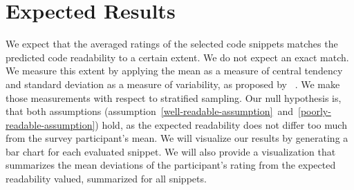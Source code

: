 \documentclass[%
class=scrreprt,
chapterprefix=false,%
open=right,%
twoside=false,%
paper=a4,%
logofile={Logo\_zentral\_farbig\_EN.png},%
thesistype=masterproposal,%
UKenglish,%
]{se2thesis}
\begin{document}
\section{Expected Results}
We expect that the averaged ratings of the selected code snippets matches the predicted code readability to a certain extent. We do not expect an exact match.
We measure this extent by applying the mean as a measure of central tendency and standard deviation as a measure of variability, as proposed by \citeauthor{linaker2015guidelines}~\cite{linaker2015guidelines}. We make those measurements with respect to stratified sampling.
Our null hypothesis is, that both assumptions (assumption~\ref{well-readable-assumption}~and~\ref{poorly-readable-assumption}) hold, as the expected readability does not differ too much from the survey participant's mean.
We will visualize our results by generating a bar chart for each evaluated snippet. We will also provide a visualization that summarizes the mean deviations of the participant's rating from the expected readability valued, summarized for all snippets.
	
	\backmatter
	
	\printbibliography
	
\end{document}
